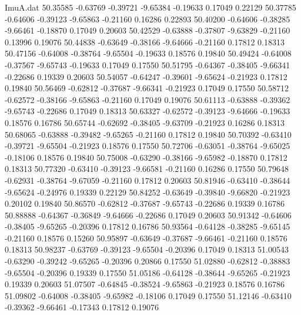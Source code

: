 \begin{filecontents}{ImuA.dat}
  50.35585   -0.63769   -0.39721   -9.65384   -0.19633    0.17049    0.22129
  50.37785   -0.64606   -0.39123   -9.65863   -0.21160    0.16286    0.22893
  50.40200   -0.64606   -0.38285   -9.66461   -0.18870    0.17049    0.20603
  50.42529   -0.63888   -0.37807   -9.63829   -0.21160    0.13996    0.19076
  50.44838   -0.63649   -0.38166   -9.64666   -0.21160    0.17812    0.18313
  50.47156   -0.64008   -0.38764   -9.65504   -0.19633    0.18576    0.19840
  50.49424   -0.64008   -0.37567   -9.65743   -0.19633    0.17049    0.17550
  50.51795   -0.64367   -0.38405   -9.66341   -0.22686    0.19339    0.20603
  50.54057   -0.64247   -0.39601   -9.65624   -0.21923    0.17812    0.19840
  50.56469   -0.62812   -0.37687   -9.66341   -0.21923    0.17049    0.17550
  50.58712   -0.62572   -0.38166   -9.65863   -0.21160    0.17049    0.19076
  50.61113   -0.63888   -0.39362   -9.65743   -0.22686    0.17049    0.18313
  50.63327   -0.62572   -0.39123   -9.64666   -0.19633    0.18576    0.16786
  50.65744   -0.62692   -0.38405   -9.63709   -0.21923    0.16286    0.18313
  50.68065   -0.63888   -0.39482   -9.65265   -0.21160    0.17812    0.19840
  50.70392   -0.63410   -0.39721   -9.65504   -0.21923    0.18576    0.17550
  50.72706   -0.63051   -0.38764   -9.65025   -0.18106    0.18576    0.19840
  50.75008   -0.63290   -0.38166   -9.65982   -0.18870    0.17812    0.18313
  50.77320   -0.63410   -0.39123   -9.66581   -0.21160    0.16286    0.17550
  50.79648   -0.62931   -0.38764   -9.67059   -0.21160    0.17812    0.20603
  50.81946   -0.63410   -0.38644   -9.65624   -0.24976    0.19339    0.22129
  50.84252   -0.63649   -0.39840   -9.66820   -0.21923    0.20102    0.19840
  50.86570   -0.62812   -0.37687   -9.65743   -0.22686    0.19339    0.16786
  50.88888   -0.64367   -0.36849   -9.64666   -0.22686    0.17049    0.20603
  50.91342   -0.64606   -0.38405   -9.65265   -0.20396    0.17812    0.16786
  50.93564   -0.64128   -0.38285   -9.65145   -0.21160    0.18576    0.15260
  50.95897   -0.63649   -0.37687   -9.66461   -0.21160    0.18576    0.18313
  50.98237   -0.63769   -0.39123   -9.65504   -0.20396    0.17049    0.18313
  51.00543   -0.63290   -0.39242   -9.65265   -0.20396    0.20866    0.17550
  51.02880   -0.62812   -0.38883   -9.65504   -0.20396    0.19339    0.17550
  51.05186   -0.64128   -0.38644   -9.65265   -0.21923    0.19339    0.20603
  51.07507   -0.64845   -0.38524   -9.65863   -0.21923    0.18576    0.16786
  51.09802   -0.64008   -0.38405   -9.65982   -0.18106    0.17049    0.17550
  51.12146   -0.63410   -0.39362   -9.66461   -0.17343    0.17812    0.19076

\end{filecontents}
